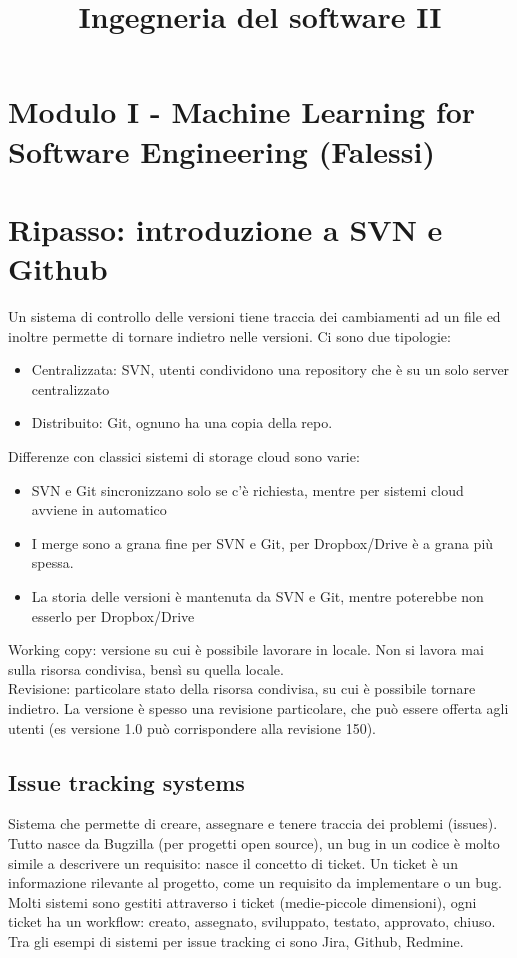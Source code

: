 \documentclass{article}
\title{Ingegneria del software II}
\begin{document}
\Large
\tableofcontents
\section{Modulo I - Machine Learning for Software Engineering (Falessi)}
\section{Ripasso: introduzione a SVN e Github}
Un sistema di controllo delle versioni tiene traccia dei cambiamenti ad un file ed inoltre permette di tornare indietro nelle versioni. Ci sono due tipologie:
\begin{itemize}
\item Centralizzata: SVN, utenti condividono una repository che è su un solo server centralizzato
\item Distribuito: Git, ognuno ha una copia della repo.
\end{itemize}
Differenze con classici sistemi di storage cloud sono varie:
\begin{itemize}
\item SVN e Git sincronizzano solo se c'è richiesta, mentre per sistemi cloud avviene in automatico
\item I merge sono a grana fine per SVN e Git, per Dropbox/Drive è a grana più spessa.
\item La storia delle versioni è mantenuta da SVN e Git, mentre poterebbe non esserlo per Dropbox/Drive
\end{itemize}
Working copy: versione su cui è possibile lavorare in locale. Non si lavora mai sulla risorsa condivisa, bensì su quella locale. \\ Revisione: particolare stato della risorsa condivisa, su cui è possibile tornare indietro. La versione è spesso una revisione particolare, che può essere offerta agli utenti (es versione 1.0 può corrispondere alla revisione 150).
\subsection{Issue tracking systems}
Sistema che permette di creare, assegnare e tenere traccia dei problemi (issues). Tutto nasce da Bugzilla (per progetti open source), un bug in un codice è molto simile a descrivere un requisito: nasce il concetto di ticket. Un ticket è un informazione rilevante al progetto, come un requisito da implementare o un bug.\\ Molti sistemi sono gestiti attraverso i ticket (medie-piccole dimensioni), ogni ticket ha un workflow: creato, assegnato, sviluppato, testato, approvato, chiuso. Tra gli esempi di sistemi per issue tracking ci sono Jira, Github, Redmine.
\end{document}
